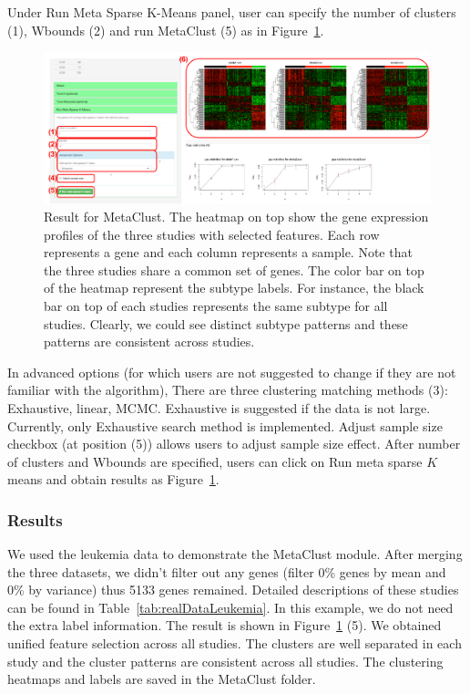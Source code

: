 \begin{steps}
Under Run Meta Sparse K-Means panel,
user can specify the number of clusters {\color{red} (1)}, Wbounds {\color{red} (2)} and run MetaClust {\color{red} (5)} 
as in Figure~\ref{fig:mskmRes}.
\begin{figure}[H]
\begin{center}
\includegraphics[scale=0.5]{./figure/metaClust/mskmRes.pdf}
\caption{Result for MetaClust.
The heatmap on top show the gene expression profiles of the three studies with selected features.
Each row represents a gene and each column represents a sample.
Note that the three studies share a common set of genes.
The color bar on top of the heatmap represent the subtype labels.
For instance, the black bar on top of each studies represents the same subtype  for all studies.
Clearly, we could see distinct subtype patterns and these patterns are consistent across studies.
}
\label{fig:mskmRes}
\end{center}
\end{figure}
In advanced options (for which users are not suggested to change if they are not familiar with the algorithm), 
There are three clustering matching methods {\color{red} (3)}: Exhaustive, linear, MCMC.
Exhaustive is suggested if the data is not large.
Currently, only Exhaustive search method is implemented.
Adjust sample size checkbox (at position {\color{red} (5)}) allows users to adjust sample size effect.
After number of clusters and Wbounds are specified,
users can click on Run meta sparse $K$ means and obtain results as Figure~\ref{fig:mskmRes}.
\end{steps}


\subsubsection{Results}

We used the leukemia data to demonstrate the MetaClust module.
After merging the three datasets, we didn't filter out any genes (filter 0\% genes by mean and 0\% by variance) thus 5133 genes remained.
Detailed descriptions of these studies can be found in Table~\ref{tab:realDataLeukemia}. 
In this example, we do not need the extra label information.
The result is shown in Figure~\ref{fig:mskmRes} {\color{red} (5)}.
We obtained unified feature selection across all studies.
The clusters are well separated in each study and the cluster patterns are consistent across all studies.
The clustering heatmaps and labels are saved in the MetaClust folder.











